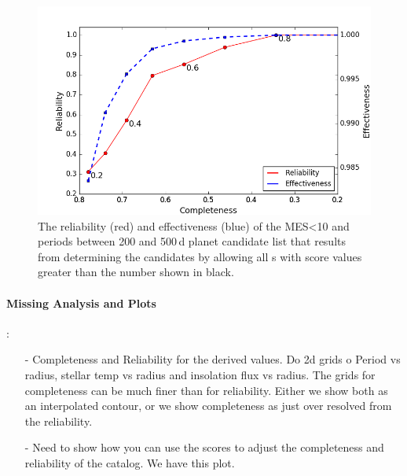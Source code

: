 \begin{figure}[h!]
 \begin{center}
  \includegraphics[width=1.0\linewidth]{fig-CRadjustScore-DR25.png}
  \caption{\label{f:adjscore}The reliability (red) and effectiveness (blue) of the MES<10 and periods between 200 and 500\,d planet candidate list that results from determining the candidates by allowing all \opstce s with score values greater than the number shown in black.}
 \end{center}
 \end{figure}

\paragraph{Missing Analysis and Plots}:
\begin{itemize} 

\item[-] Completeness and Reliability for the derived values.
Do 2d grids o Period vs radius, stellar temp vs radius and insolation flux vs radius.  The grids for completeness can be much finer than for reliability.  Either we show both as an interpolated contour, or we show completeness as just over resolved from the reliability. 

\item[-] Need to show how you can use the scores to adjust the completeness and reliability of the catalog. We have this plot.
\end{itemize}
